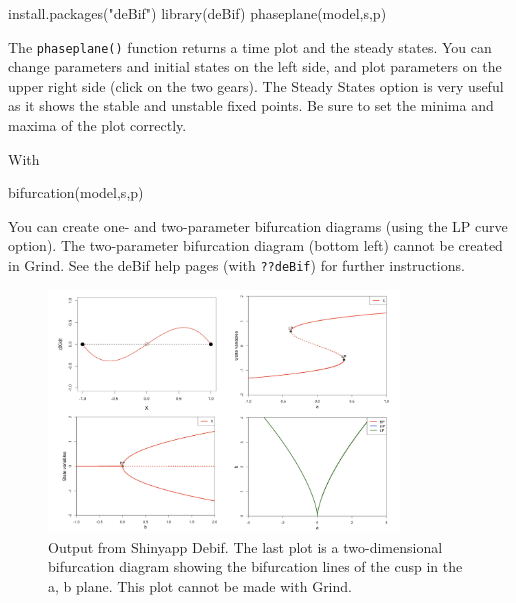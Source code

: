 \documentclass[
  letterpaper,
]{scrbook}
\newenvironment{Shaded}{\begin{snugshade}}{\end{snugshade}}
\newcommand{\FunctionTok}[1]{\textcolor[rgb]{0.28,0.35,0.67}{#1}}
\newcommand{\NormalTok}[1]{\textcolor[rgb]{0.00,0.23,0.31}{#1}}
\newcommand{\StringTok}[1]{\textcolor[rgb]{0.13,0.47,0.30}{#1}}
\begin{document}
\begin{Shaded}
\begin{Highlighting}[]
\FunctionTok{install.packages}\NormalTok{(}\StringTok{"deBif"}\NormalTok{)}
\FunctionTok{library}\NormalTok{(deBif)}
\FunctionTok{phaseplane}\NormalTok{(model,s,p)}
\end{Highlighting}
\end{Shaded}

The \texttt{phaseplane()} function returns a time plot and the steady
states. You can change parameters and initial states on the left side,
and plot parameters on the upper right side (click on the two gears).
The Steady States option is very useful as it shows the stable and
unstable fixed points. Be sure to set the minima and maxima of the plot
correctly.

With

\begin{Shaded}
\begin{Highlighting}[]
\FunctionTok{bifurcation}\NormalTok{(model,s,p)}
\end{Highlighting}
\end{Shaded}

You can create one- and two-parameter bifurcation diagrams (using the LP
curve option). The two-parameter bifurcation diagram (bottom left)
cannot be created in Grind. See the deBif help pages (with
\texttt{??deBif}) for further instructions.

\begin{figure}

{\centering \includegraphics[width=3.66382in,height=\textheight]{media/ch5/image4.jpg}

}

\caption{\label{fig-ch5-img4-old-52}Output from Shinyapp Debif. The last
plot is a two-dimensional bifurcation diagram showing the bifurcation
lines of the cusp in the a, b plane. This plot cannot be made with
Grind.}

\end{figure}
\end{document}
